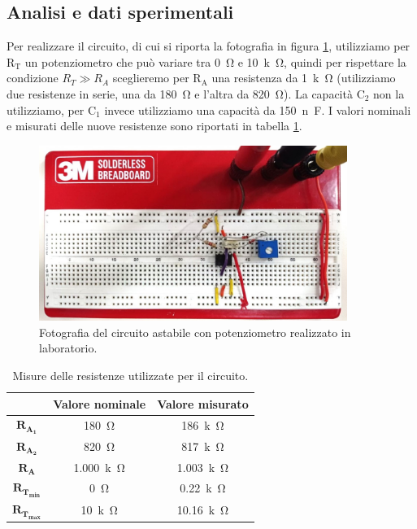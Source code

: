 \documentclass{report}
\begin{document}
\subsection{Analisi e dati sperimentali}
Per realizzare il circuito, di cui si riporta la fotografia in figura \ref{figura:circuito4}, utilizziamo per $\mathrm{R_T}$ un potenziometro che può variare tra \SI{0}{\ohm} e \SI{10}{k\ohm}, quindi per rispettare la condizione $\displaystyle{R_{T}\gg R_A}$ sceglieremo per $\mathrm{R_A}$ una resistenza da \SI{1}{k\ohm} (utilizziamo due resistenze in serie, una da \SI{180}{\ohm} e l'altra da \SI{820}{\ohm}). La capacità $\mathrm{C_2}$ non la utilizziamo, per $\mathrm{C_1}$  invece utilizziamo una capacità da \SI{150}{n\farad}. I valori nominali e misurati delle nuove resistenze sono riportati in tabella \ref{table:res4}.
\begin{figure}[h!]
	\centering
	\includegraphics[height=5.7cm]{immagini/circuito4}
	\caption{Fotografia del circuito astabile con potenziometro realizzato in laboratorio.}
	\label{figura:circuito4}
\end{figure}
\begin{table}[h!]
	\centering
	\begin{tabular}{|c|c|c|}
		\cline{2-3} 
		\multicolumn{1}{c|}{} & \textbf{Valore nominale} & \textbf{Valore misurato}\\ 
		\hline
		$\mathbf{R_{A_1}}$ & \SI{180}{\ohm} & \SI{186}{k\ohm} \\ 
		\hline
		$\mathbf{R_{A_2}}$ & \SI{820}{\ohm} & \SI{817}{k\ohm} \\ 
		\hline
		$\mathbf{R_{A}}$ & \SI{1.000}{k\ohm} & \SI{1.003}{k\ohm} \\ 
		\hline
		$\mathbf{R_{T_{min}}}$ & \SI{0}{\ohm} & \SI{0.22}{k\ohm} \\ 
		\hline
		$\mathbf{R_{T_{max}}}$ & \SI{10}{k\ohm} & \SI{10.16}{k\ohm} \\ 
		\hline
	\end{tabular}
	\caption{Misure delle resistenze utilizzate per il circuito.}
	\label{table:res4}
\end{table}
\end{document}
